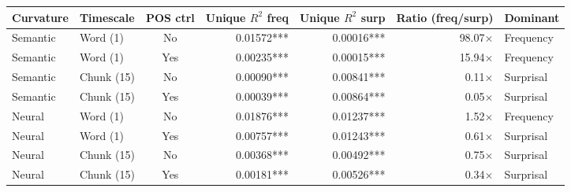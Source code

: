 \begin{tabular}{llcrrrl}
  \toprule
  Curvature & Timescale & POS ctrl & Unique $R^2$ freq & Unique $R^2$ surp & Ratio (freq/surp) & Dominant \\
  \midrule
  Semantic & Word (1) & No & 0.01572*** & 0.00016*** & 98.07$\times$ & Frequency \\
  Semantic & Word (1) & Yes & 0.00235*** & 0.00015*** & 15.94$\times$ & Frequency \\
  Semantic & Chunk (15) & No & 0.00090*** & 0.00841*** & 0.11$\times$ & Surprisal \\
  Semantic & Chunk (15) & Yes & 0.00039*** & 0.00864*** & 0.05$\times$ & Surprisal \\
  Neural & Word (1) & No & 0.01876*** & 0.01237*** & 1.52$\times$ & Frequency \\
  Neural & Word (1) & Yes & 0.00757*** & 0.01243*** & 0.61$\times$ & Surprisal \\
  Neural & Chunk (15) & No & 0.00368*** & 0.00492*** & 0.75$\times$ & Surprisal \\
  Neural & Chunk (15) & Yes & 0.00181*** & 0.00526*** & 0.34$\times$ & Surprisal \\
  \bottomrule
\end{tabular}
